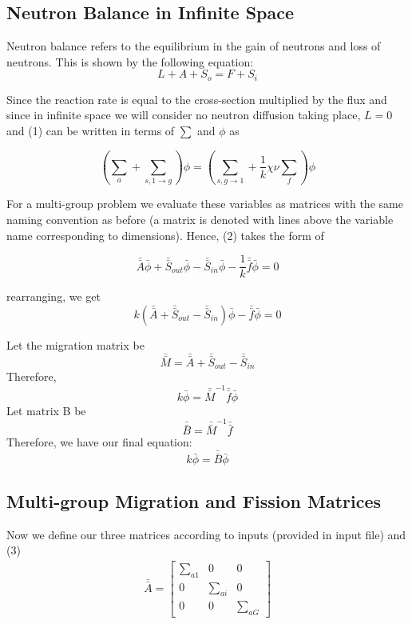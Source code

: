 \documentclass[11pt, oneside]{article}   	%
\begin{document}
\subsection{Neutron Balance in Infinite Space}

Neutron balance refers to the equilibrium in the gain of neutrons and loss of neutrons. This is shown by the following equation:
\begin{equation}
L+A+S_{o} = F + S_{i}
\end{equation}

Since the reaction rate is equal to the cross-section multiplied by the flux and since in infinite space we will consider no neutron diffusion taking place, $L=0$ and (1) can be written in terms of $\sum$ and $\phi$ as

\begin{equation}
(\sum _{a} + \sum _{s,1\rightarrow g})\phi  = (\sum _{s,g\rightarrow 1} + \frac{1}{k}\chi \nu \sum _{f})\phi 
\end{equation}

For a multi-group problem we evaluate these variables as matrices with the same naming convention as before (a matrix is denoted with lines above the variable name corresponding to dimensions). Hence, (2) takes the form of  

$$\bar{\bar{A}}\bar{\phi } + \bar{\bar{S}}_{out}\bar{\phi } - \bar{\bar{S}}_{in}\bar{\phi } - \frac{1}{k}\bar{\bar{f}}\bar{\phi } = 0$$

rearranging, we get
\begin{equation}
k(\bar{\bar{A}}+ \bar{\bar{S}}_{out} - \bar{\bar{S}}_{in})\bar{\phi } - \bar{\bar{f}}\bar{\phi } = 0\end{equation}

Let the migration matrix be \begin{equation}\bar{\bar{M}} = \bar{\bar{A}}+ \bar{\bar{S}}_{out} - \bar{\bar{S}}_{in}\end{equation}Therefore, 
\\
$$k\bar{\phi } = \bar{\bar{M}}^{-1}\bar{\bar{f}}\bar{\phi }$$
Let matrix B be 
$$\bar{\bar{B}} = \bar{\bar{M}}^{-1}\bar{\bar{f}}$$
Therefore, we have our final equation:
\begin{equation}k\bar{\phi } = \bar{\bar{B}}\bar{\phi }\end{equation}

\subsection{Multi-group Migration and Fission Matrices}
Now we define our three matrices according to inputs (provided in input file) and (3)
\begin{align*}
\bar{\bar{A}}= \begin{bmatrix}
 \sum _{a1} & 0 & 0\\ 
 0 & \sum _{ai} &  0 \\ 
 0  & 0 &  \sum _{aG}
\end{bmatrix}
\end{align*}
\end{document}
